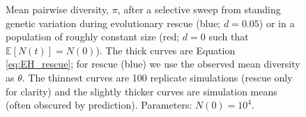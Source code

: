 \documentclass[]{article}
\begin{document}
\begin{figure}[htb]
\caption{
Mean pairwise diversity, $\pi$, after a selective sweep from standing genetic variation during evolutionary rescue (blue; $d=0.05$) or in a population of roughly constant size (red; $d=0$ such that $\mathbb{E}[N(t)]=N(0)$).
The thick curves are Equation \ref{eq:EH_rescue}; for rescue (blue) we use the observed mean diversity as $\theta$.
The thinnest curves are 100 replicate simulations (rescue only for clarity) and the slightly thicker curves are simulation means (often obscured by prediction).
Parameters: $N(0)=10^4$.
}%
\label{fig:rescueSGV_heterozygosity_empirical}
\end{figure}
\end{document}
